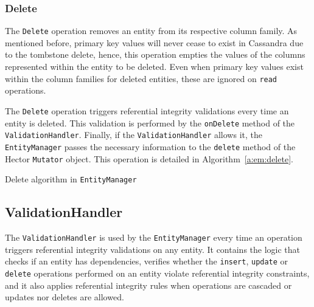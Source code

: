 		
		\subsubsection{Delete}\label{ss:delete}
		The  \texttt{Delete} operation removes  an entity from its respective column
		family.  As mentioned before,  primary key values  will never cease to exist
		in Cassandra due to the tombstone delete, hence, this operation
		empties the values of the columns represented within the entity to be deleted.
		Even when primary key values exist within the column families for deleted
		entities, these are ignored on \texttt{read} operations.
		
		The \texttt{Delete} operation triggers referential
		integrity validations every time an entity is deleted.  
		 This validation is performed by the \texttt{onDelete} method of the
		 \texttt{ValidationHandler}.  Finally,  if the
		\texttt{ValidationHandler} allows it, the \texttt{EntityManager} passes the
		 necessary information to the \texttt{delete} method of the Hector
		 \texttt{Mutator} object. This operation is detailed in
		 Algorithm~\ref{a:em:delete}.
 		
 		\begin{algorithm}[H]
			\caption{Delete algorithm in \texttt{EntityManager}}\label{a:em:delete}
			\small
			
			
		\end{algorithm}
		
 		
		
		
		
		
		\subsection{ValidationHandler}\label{ss:VH}
		The \texttt{ValidationHandler} is used by the \texttt{EntityManager} every time
		an operation triggers  referential integrity validations on any entity.
		It contains the  logic that  checks  if an entity has dependencies,
		verifies whether the \texttt{insert}, \texttt{update} or
		\texttt{delete} operations performed on an entity  violate  referential
		integrity constraints, and it also applies referential integrity rules
		when operations are cascaded or updates nor deletes are allowed. 
		
